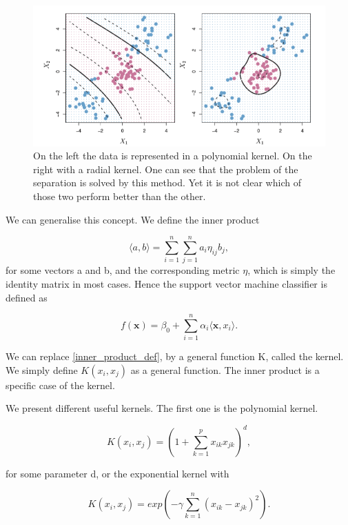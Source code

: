 \documentclass{article}
\begin{document}
\begin{figure}[ht!]
    \centering
    \includegraphics[width=\textwidth]{support_vector_machine_kernel.png}
    \caption{On the left the data is represented in a polynomial kernel. On the right with a radial kernel. One can see that the problem of the separation is solved by this method. Yet it is not clear which of those two perform better than the other.}
    \label{figure_SVM_new_kernel}
\end{figure}

We can generalise this concept. We define the inner product

\begin{equation}\label{inner_product_def}
    \langle a,b \rangle = \sum_{i=1}^n \sum_{j=1}^n a_i \eta_{ij} b_j,
\end{equation}
for some vectors a and b, and the corresponding metric $\eta$, which is simply the identity matrix in most cases. Hence the support vector machine classifier is defined as

\begin{equation}
    f(\mathbf{x}) = \beta_0 + \sum_{i=1}^n \alpha_i  \langle \mathbf{x},x_i \rangle. 
\end{equation}

We can replace \eqref{inner_product_def}, by a general function K, called the kernel. We simply define $K(x_i,x_j)$ as a general function. The inner product is a specific case of the kernel.

We present different useful kernels. The first one is the polynomial kernel.

\begin{equation}
    K(x_i,x_j) = (1+ \sum_{k=1}^p x_{ik}x_{jk} )^d,
\end{equation}

for some parameter d, or the exponential kernel with

\begin{equation}
     K(x_i,x_j) = exp (-\gamma \sum_{k=1}^n(x_{ik}-x_{jk})^2).
\end{equation}
\end{document}
